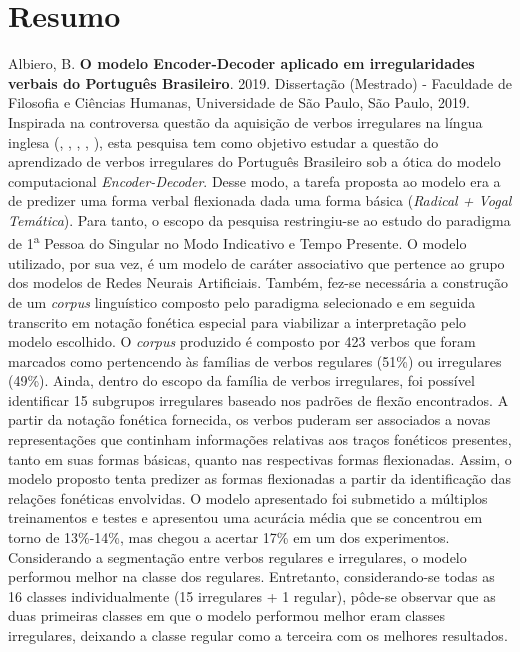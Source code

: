 \documentclass[12pt,twoside,a4paper]{book}
\newcommand{\aup}{\textsuperscript}
\begin{document}
\chapter*{Resumo}
\noindent Albiero, B. \textbf{O modelo Encoder-Decoder aplicado em irregularidades verbais do Português Brasileiro}. 
2019.
Dissertação (Mestrado) - Faculdade de Filosofia e Ciências Humanas,
Universidade de São Paulo, São Paulo, 2019.
\\

Inspirada na controversa questão da aquisição de verbos irregulares na língua inglesa (\cite{chomsky:1968}, \cite{Pinker:1999}, \cite{Pinker:1988}, \cite{Albright2003RulesVA}, \cite{kirov:2018}), esta pesquisa tem como objetivo estudar a questão do aprendizado de verbos irregulares do Português Brasileiro sob a ótica do modelo computacional \textit{Encoder-Decoder}. Desse modo, a tarefa proposta ao modelo era a de predizer uma forma verbal flexionada dada uma forma básica (\textit{Radical + Vogal Temática}). Para tanto, o escopo da pesquisa restringiu-se ao estudo do paradigma de 1\aup{a} Pessoa do Singular no Modo Indicativo e Tempo Presente. O modelo utilizado, por sua vez, é um modelo de caráter associativo que pertence ao grupo dos modelos de Redes Neurais Artificiais. Também, fez-se necessária a construção de um \textit{corpus} linguístico composto pelo paradigma selecionado e em seguida transcrito em notação fonética especial para viabilizar a interpretação pelo modelo escolhido. O \textit{corpus} produzido é composto por 423 verbos que foram marcados como pertencendo às famílias de verbos regulares (51\%) ou irregulares (49\%). Ainda, dentro do escopo da família de verbos irregulares, foi possível identificar 15 subgrupos irregulares baseado nos padrões de flexão encontrados. A partir da notação fonética fornecida, os verbos puderam ser associados a novas representações que continham informações relativas aos traços fonéticos presentes, tanto em suas formas básicas, quanto nas  respectivas formas flexionadas. Assim, o modelo proposto tenta predizer as formas flexionadas a partir da identificação das relações fonéticas envolvidas. O modelo apresentado foi submetido a múltiplos treinamentos e testes e apresentou uma acurácia média que se concentrou em torno de 13\%-14\%, mas chegou a acertar 17\% em um dos experimentos. Considerando a segmentação entre verbos regulares e irregulares, o modelo performou melhor na classe dos regulares. Entretanto, considerando-se todas as 16 classes individualmente (15 irregulares + 1 regular), pôde-se observar que as duas primeiras classes em que o modelo performou melhor eram classes irregulares, deixando a classe regular como a terceira com os melhores resultados.
\end{document}
